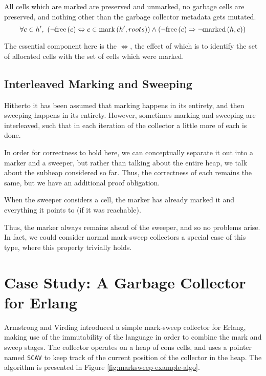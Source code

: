 \begin{definition}
  \label{def:ms-correct-sweeping}
  All cells which are marked are preserved and unmarked, no garbage
  cells are preserved, and nothing other than the garbage collector
  metadata gets mutated.
  \[\forall c \in h',\ \left(\lnot\mathrm{free}\left(c\right) \Leftrightarrow c \in
    \mathrm{mark}\left(h', roots\right)\right) \land \left(\lnot\mathrm{free}\left(c\right) \Rightarrow
    \lnot\mathrm{marked}\left(h, c\right)\right)\]
\end{definition}

The essential component here is the $\iff$, the effect of which is to
identify the set of allocated cells with the set of cells which were
marked.

\subsection{Interleaved Marking and Sweeping}
\label{sec:marksweep-sweeping-interleaved}

Hitherto it has been assumed that marking happens in its entirety, and
then sweeping happens in its entirety. However, sometimes marking and
sweeping are interleaved, such that in each iteration of the collector
a little more of each is done.

In order for correctness to hold here, we can conceptually separate it
out into a marker and a sweeper, but rather than talking about the
entire heap, we talk about the subheap considered so far. Thus, the
correctness of each remains the same, but we have an additional proof
obligation.

\begin{definition}
  \label{def:ms-interleaved}
  When the sweeper considers a cell, the marker has already marked it
  and everything it points to (if it was reachable).
\end{definition}

Thus, the marker always remains ahead of the sweeper, and so no
problems arise. In fact, we could consider normal mark-sweep
collectors a special case of this type, where this property trivially
holds.

\section{Case Study: A Garbage Collector for Erlang}
\label{sec:marksweep-example}

Armstrong and Virding\cite{Armstrong95} introduced a simple mark-sweep
collector for Erlang, making use of the immutability of the language
in order to combine the mark and sweep stages. The collector operates
on a heap of cons cells, and uses a pointer named \texttt{SCAV} to
keep track of the current position of the collector in the heap. The
algorithm is presented in Figure \ref{fig:marksweep-example-algo}.

